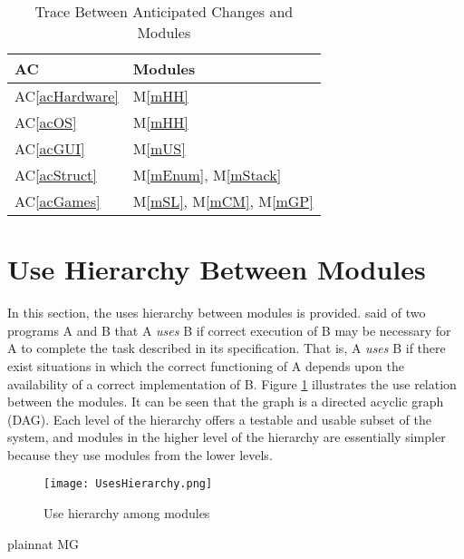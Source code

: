 \documentclass[12pt, titlepage]{article}
\newcommand{\acref}[1]{AC\ref{#1}}
\newcommand{\mref}[1]{M\ref{#1}}
\begin{document}
	\begin{table}[H]
		\centering
		\begin{tabular}{p{} p{}}
			\toprule
			\textbf{AC} & \textbf{Modules}\\
			\midrule
			\acref{acHardware} & \mref{mHH}\\
			\acref{acOS} & \mref{mHH}\\
			\acref{acGUI} & \mref{mUS}\\
			\acref{acStruct} & \mref{mEnum}, \mref{mStack}\\
			\acref{acGames} & \mref{mSL}, \mref{mCM}, \mref{mGP}\\
			\bottomrule
		\end{tabular}
		\caption{Trace Between Anticipated Changes and Modules}
		\label{TblACT}
	\end{table}
	\section{Use Hierarchy Between Modules} \label{SecUse}
	In this section, the uses hierarchy between modules is provided. 
	\citet{Parnas1978} said of two programs A and B that A {\em uses} B if 
	correct execution of B may be necessary for A to complete the task 
	described in its specification. That is, A {\em uses} B if there exist 
	situations in which the correct functioning of A depends upon the 
	availability of a correct implementation of B.  Figure \ref{FigUH} 
	illustrates the use relation between the modules. It can be seen that the 
	graph is a directed acyclic graph (DAG). Each level of the hierarchy offers 
	a testable and usable subset of the system, and modules in the higher level 
	of the hierarchy are essentially simpler because they use modules from the 
	lower levels.
	\begin{figure}[H]
		\centering
		\texttt{[image: UsesHierarchy.png]}
		\caption{Use hierarchy among modules}
		\label{FigUH}
	\end{figure}
	 {plainnat}
	 {MG}
\end{document}
